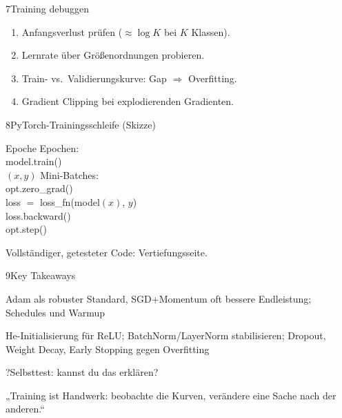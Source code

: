 \begin{hngrid}
\begin{hnp}[raster multicolumn=3,acc=hnpurple]{7}{Training debuggen}
\begin{enumerate}
\item Anfangsverlust prüfen ($\approx\log K$ bei $K$ Klassen).
\item Lernrate über Größenordnungen probieren.
\item Train- vs.\ Validierungskurve: Gap $\Rightarrow$ Overfitting.
\item Gradient Clipping bei explodierenden Gradienten.
\end{enumerate}
\end{hnp}
%
\begin{hnp}[raster multicolumn=3,acc=hnteal]{8}{PyTorch-Trainingsschleife (Skizze)}
\begin{pcode}[PyTorch]
 Epoche  Epochen:\\
\hii model.train()\\
\hii {} $(x,y)$  Mini-Batches:\\
\hiii opt.zero\_grad()\\
\hiii loss $=$ loss\_fn(model$(x)$, $y$)\\
\hiii loss.backward() \ \\
\hiii opt.step() \ \ \ \ 
\end{pcode}
Vollständiger, getesteter Code: Vertiefungsseite.
\end{hnp}
%
\begin{hnp}[raster multicolumn=6,acc=hnorange]{9}{Key Takeaways}
\begin{hnchk}
\item Adam als robuster Standard, SGD+Momentum oft bessere Endleistung; Schedules und Warmup
\item He-Initialisierung für ReLU; BatchNorm/LayerNorm stabilisieren; Dropout, Weight Decay, Early Stopping gegen Overfitting
\end{hnchk}
\end{hnp}
%
\begin{hnp}[raster multicolumn=6,acc=hnpurple,colback=hnlilac!30]{?}{Selbsttest: kannst du das erklären?}
\end{hnp}
%
\begin{hnbanner}[raster multicolumn=6]
„Training ist Handwerk: beobachte die Kurven, verändere eine Sache nach der anderen.“
\end{hnbanner}
\end{hngrid}

